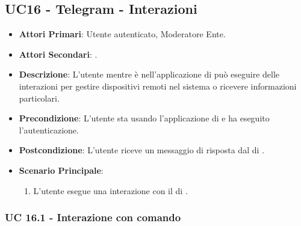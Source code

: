 \subsection{UC16 - Telegram - Interazioni}
		
		
	\begin{itemize}
		\item \textbf{Attori Primari}: Utente autenticato, Moderatore Ente.
		\item \textbf{Attori Secondari}: .
		\item \textbf{Descrizione}: L'utente mentre è nell'applicazione di  può eseguire delle interazioni per gestire dispositivi remoti nel sistema o ricevere informazioni particolari. 
		\item \textbf{Precondizione}: L'utente sta usando l'applicazione di  e ha eseguito l'autenticazione.
		\item \textbf{Postcondizione}: L'utente riceve un messaggio di risposta dal  di .
		\item \textbf{Scenario Principale}:
		\begin{enumerate}
			\item L'utente esegue una interazione con il  di .
		\end{enumerate}
	\end{itemize}
	
	\subsubsection{UC 16.1 - Interazione con comando}


